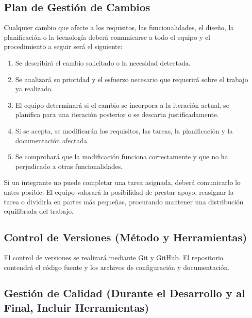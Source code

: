 \subsection{Plan de Gestión de Cambios}

Cualquier cambio que afecte a los requisitos, las funcionalidades, el diseño, la planificación o la tecnología deberá comunicarse a todo el equipo y el procedimiento a seguir será el siguiente:

\begin{enumerate}
    \item Se describirá el cambio solicitado o la necesidad detectada.
    \item Se analizará su prioridad y el esfuerzo necesario que requerirá sobre el trabajo ya realizado.
    \item El equipo determinará si el cambio se incorpora a la iteración actual, se planifica para una iteración posterior o se descarta justificadamente.
    \item Si se acepta, se modificarán los requisitos, las tareas, la planificación y la documentación afectada.
    \item Se comprobará que la modificación funciona correctamente y que no ha perjudicado a otras funcionalidades.
\end{enumerate}

Si un integrante no puede completar una tarea asignada, deberá comunicarlo lo antes posible. El equipo valorará la posibilidad de prestar apoyo, reasignar la tarea o dividirla en partes más pequeñas, procurando mantener una distribución equilibrada del trabajo.

\subsection{Control de Versiones (Método y Herramientas)}

El control de versiones se realizará mediante Git y GitHub. El repositorio contendrá el código fuente y los archivos de configuración y documentación.

\subsection{Gestión de Calidad (Durante el Desarrollo y al Final, Incluir Herramientas)}

